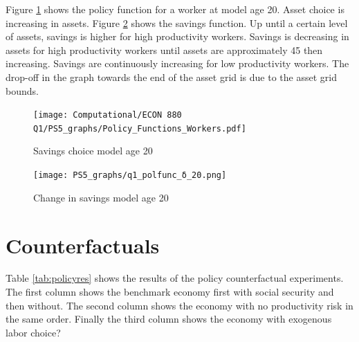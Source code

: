 \documentclass[12pt]{article}
\begin{document}
Figure \ref{fig:pol20} shows the policy function for a worker at model age 20. Asset choice is increasing in assets. Figure \ref{fig:pol_change20} shows the savings function. Up until a certain level of assets, savings is higher for high productivity workers. Savings is decreasing in assets for high productivity workers until assets are approximately 45 then increasing. Savings are continuously increasing for low productivity workers. The drop-off in the graph towards the end of the asset grid is due to the asset grid bounds. 
\\

\begin{figure}[h!]
    \centering
    \caption{Savings choice model age 20}
    \vspace{1cm}
    \texttt{[image: Computational/ECON 880 Q1/PS5\_graphs/Policy\_Functions\_Workers.pdf]}
    
    \label{fig:pol20}
\end{figure}

\begin{figure}[h!]
    \centering
    \caption{Change in savings model age 20}
    \vspace{1cm}
    \texttt{[image: PS5\_graphs/q1\_polfunc\_δ\_20.png]}
    
    \label{fig:pol_change20}
\end{figure}

\newpage
\section{Counterfactuals}

Table \ref{tab:policyres} shows the results of the policy counterfactual experiments. The first column shows the benchmark economy first with social security and then without. The second column shows the economy with no productivity risk in the same order. Finally the third column shows the economy with exogenous labor choice? 
\end{document}
